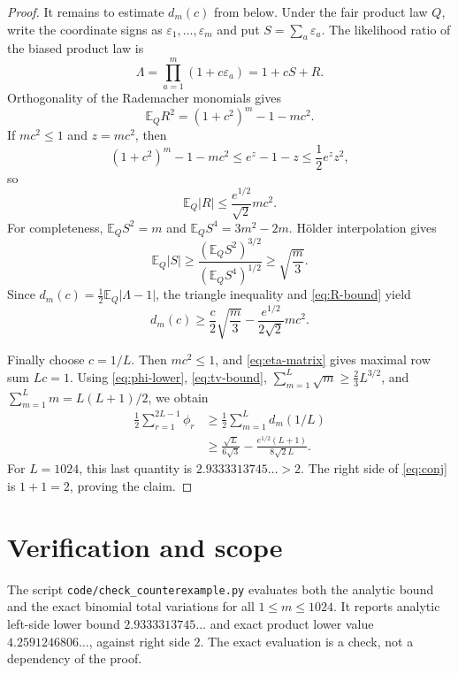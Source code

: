 \documentclass[11pt]{article}
\newcommand{\E}{\mathbb E}
\begin{document}
\begin{proof}
It remains to estimate $d_m(c)$ from below.  Under the fair product law $Q$,
write the coordinate signs as $\varepsilon_1,\ldots,\varepsilon_m$ and put
$S=\sum_a\varepsilon_a$.  The likelihood ratio of the biased product law is
\[
 \Lambda=\prod_{a=1}^m(1+c\varepsilon_a)=1+cS+R.
\]
Orthogonality of the Rademacher monomials gives
\begin{equation}\label{eq:remainder}
 \E_Q R^2=(1+c^2)^m-1-mc^2.
\end{equation}
If $mc^2\leq1$ and $z=mc^2$, then
\[
 (1+c^2)^m-1-mc^2
 \leq e^z-1-z\leq\frac12e^z z^2,
\]
so
\begin{equation}\label{eq:R-bound}
 \E_Q|R|\leq\frac{e^{1/2}}{\sqrt2}mc^2.
\end{equation}
For completeness, $\E_QS^2=m$ and $\E_QS^4=3m^2-2m$.  H\"older interpolation
gives
\[
 \E_Q|S|\geq
 \frac{(\E_QS^2)^{3/2}}{(\E_QS^4)^{1/2}}
 \geq\sqrt{\frac m3}.
\]
Since $d_m(c)=\frac12\E_Q|\Lambda-1|$, the triangle inequality and
\eqref{eq:R-bound} yield
\begin{equation}\label{eq:tv-bound}
 d_m(c)\geq
 \frac c2\sqrt{\frac m3}
 -\frac{e^{1/2}}{2\sqrt2}mc^2.
\end{equation}

Finally choose $c=1/L$.  Then $mc^2\leq1$, and \eqref{eq:eta-matrix} gives
maximal row sum $Lc=1$.  Using \eqref{eq:phi-lower},
\eqref{eq:tv-bound}, $\sum_{m=1}^L\sqrt m\geq\frac23L^{3/2}$, and
$\sum_{m=1}^Lm=L(L+1)/2$, we obtain
\begin{align*}
 \frac12\sum_{r=1}^{2L-1}\phi_r
 &\geq\frac12\sum_{m=1}^Ld_m(1/L)\\
 &\geq \frac{\sqrt L}{6\sqrt3}
 -\frac{e^{1/2}(L+1)}{8\sqrt2L}.
\end{align*}
For $L=1024$, this last quantity is
$2.9333313745\ldots>2$.  The right side of \eqref{eq:conj} is
$1+1=2$, proving the claim.
\end{proof}

\section{Verification and scope}

The script \texttt{code/check\_counterexample.py} evaluates both the analytic
bound and the exact binomial total variations for all $1\leq m\leq1024$.
It reports analytic left-side lower bound $2.9333313745\ldots$ and exact
product lower value $4.2591246806\ldots$, against right side $2$.  The exact
evaluation is a check, not a dependency of the proof.
\end{document}

